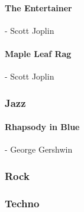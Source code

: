 				\paragraph{The Entertainer} - Scott Joplin
				\paragraph{Maple Leaf Rag} - Scott Joplin
				
			\subsubsection{Jazz}
				\paragraph{Rhapsody in Blue} - George Gershwin
			
			\subsubsection{Rock}
			
			\subsubsection{Techno}
				
			